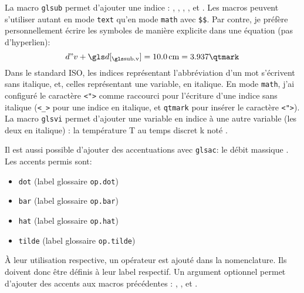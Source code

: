 \documentclass[PhD,nohyperref,english,french]{ulthese}
\begin{document}
La macro \texttt{glsub} permet d'ajouter une indice : , , , ,  et . Les macros peuvent s'utiliser autant en mode \texttt{text} qu'en mode \texttt{math} avec \texttt{\$\$}. Par contre, je préfère personnellement écrire les symboles de manière explicite dans une équation (pas d'hyperlien):
\begin{equation}
d"v + \glsub{d}{v} = \SI{10.0}{\centi\meter} = 3.937\qtmark
\end{equation}
Dans le standard ISO, les indices représentant l'abbréviation d'un mot s'écrivent sans italique, et, celles représentant une variable, en italique. En mode \texttt{math}, j'ai configuré le caractère \texttt{<">} comme raccourci pour l'écriture d'une indice sans italique (\texttt{<\_>} pour une indice en italique, et \texttt{qtmark} pour insérer le caractère \texttt{<">}). La macro \texttt{glsvi} permet d'ajouter une variable en indice à une autre variable (les deux en italique) : la température \gls{T} au temps discret \gls{k} noté .

Il est aussi possible d'ajouter des accentuations avec \texttt{glsac}: le débit massique 
. Les accents permis sont:
\begin{itemize} 
	\item \texttt{dot} (label glossaire \texttt{op.dot})
	\item \texttt{bar} (label glossaire \texttt{op.bar})
	\item \texttt{hat} (label glossaire \texttt{op.hat})
	\item \texttt{tilde} (label glossaire \texttt{op.tilde})
\end{itemize}
À leur utilisation respective, un opérateur est ajouté dans la nomenclature. Ils doivent donc être définis à leur label respectif. Un argument optionnel permet d'ajouter des accents aux macros précédentes : , ,  et .
\end{document}
